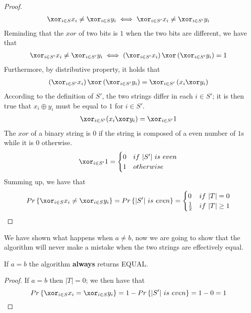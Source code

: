 \begin{proof}
    \begin{align}
        \xor_{i \in S} x_i \neq \xor_{i \in S} y_i \iff \xor_{i \in S'} x_i \neq \xor_{i \in S'} y_i 
    \end{align}
    Reminding that the $xor$ of two bits is $1$ when the two bits are different, we have that
    \begin{align}
        \xor_{i \in S'} x_i \neq \xor_{i \in S'} y_i \iff \left(\xor_{i \in S'} x_i\right) \xor \left(\xor_{i \in S'} y_i\right) = 1
    \end{align}
    Furthermore, by distributive property, it holds that
    \begin{align}
        \left(\xor_{i \in S'} x_i\right) \xor \left(\xor_{i \in S'} y_i\right) = \xor_{i \in S'}\left( x_i \xor y_i \right)
    \end{align}
    According to the definition of $S'$, the two strings differ in each $i \in S'$; it is then true that $x_i \oplus y_i$ must be equal to $1$ for $i \in S'$.
    \begin{align}
        \xor_{i \in S'}( x_i \xor y_i ) = \xor_{i \in S'} 1
    \end{align}
    The $xor$ of a binary string is $0$ if the string is composed of a even number of $1$s while it is $0$ otherwise.
    \begin{align}
        \xor_{i \in S'} 1 = 
        \begin{cases}
            0 & if \ |S'|\ is\ even\\
            1 & otherwise
        \end{cases}
    \end{align}
    Summing up, we have that
    \begin{align}
        Pr\left\{\xor_{i \in S} x_i \neq \xor_{i \in S} y_i\right\} = Pr\left\{ |S'|\ is\ even\right\} = 
        \begin{cases}
            0 & if \ |T| = 0\\
            \frac{1}{2} & if \ |T| \ge 1\\
        \end{cases}
    \end{align}
\end{proof}

We have shown what happens when $a \neq b$, now we are going to show that the algorithm will never make a mistake when the two strings are effectively equal.
%
\begin{claim}
    If $a = b$ the algorithm \textbf{always} returns EQUAL.
\end{claim}
\begin{proof}
    If $a = b$ then $|T| = 0$; we then have that
    \[
    Pr\left\{\xor_{i \in S} x_i = \xor_{i \in S} y_i\right\} = 1 - Pr\left\{ |S'|\ is\ even\right\} = 1 - 0 = 1
    \] 
\end{proof}
    

